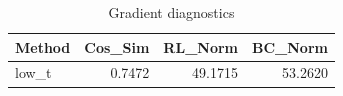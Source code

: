 \begin{table}[htbp]
\centering
\caption{Gradient diagnostics}
\label{tab:grad-diag}
\begin{tabular}{lrrr}
\toprule
\textbf{Method} & \textbf{Cos\_Sim} & \textbf{RL\_Norm} & \textbf{BC\_Norm} \\
\midrule
low\_t & 0.7472 & 49.1715 & 53.2620 \\
\bottomrule
\end{tabular}
\end{table}